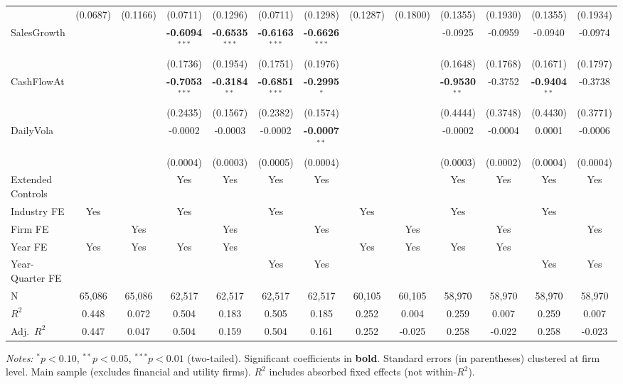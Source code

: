 \documentclass[11pt,a4paper]{article}
\begin{document}
\begin{table}[htbp]
\begin{tabular}{lcccccccccccc}
 & (0.0687) & (0.1166) & (0.0711) & (0.1296) & (0.0711) & (0.1298) & (0.1287) & (0.1800) & (0.1355) & (0.1930) & (0.1355) & (0.1934) \\
SalesGrowth &  &  & \textbf{-0.6094}$^{***}$ & \textbf{-0.6535}$^{***}$ & \textbf{-0.6163}$^{***}$ & \textbf{-0.6626}$^{***}$ &  &  & -0.0925 & -0.0959 & -0.0940 & -0.0974 \\
 &  &  & (0.1736) & (0.1954) & (0.1751) & (0.1976) &  &  & (0.1648) & (0.1768) & (0.1671) & (0.1797) \\
CashFlowAt &  &  & \textbf{-0.7053}$^{***}$ & \textbf{-0.3184}$^{**}$ & \textbf{-0.6851}$^{***}$ & \textbf{-0.2995}$^{*}$ &  &  & \textbf{-0.9530}$^{**}$ & -0.3752 & \textbf{-0.9404}$^{**}$ & -0.3738 \\
 &  &  & (0.2435) & (0.1567) & (0.2382) & (0.1574) &  &  & (0.4444) & (0.3748) & (0.4430) & (0.3771) \\
DailyVola &  &  & -0.0002 & -0.0003 & -0.0002 & \textbf{-0.0007}$^{**}$ &  &  & -0.0002 & -0.0004 & 0.0001 & -0.0006 \\
 &  &  & (0.0004) & (0.0003) & (0.0005) & (0.0004) &  &  & (0.0003) & (0.0002) & (0.0004) & (0.0004) \\
\midrule
Extended Controls &  &  & Yes & Yes & Yes & Yes &  &  & Yes & Yes & Yes & Yes \\
Industry FE & Yes &  & Yes &  & Yes &  & Yes &  & Yes &  & Yes &  \\
Firm FE &  & Yes &  & Yes &  & Yes &  & Yes &  & Yes &  & Yes \\
Year FE & Yes & Yes & Yes & Yes &  &  & Yes & Yes & Yes & Yes &  &  \\
Year-Quarter FE &  &  &  &  & Yes & Yes &  &  &  &  & Yes & Yes \\
\midrule
N & 65,086 & 65,086 & 62,517 & 62,517 & 62,517 & 62,517 & 60,105 & 60,105 & 58,970 & 58,970 & 58,970 & 58,970 \\
$R^2$ & 0.448 & 0.072 & 0.504 & 0.183 & 0.505 & 0.185 & 0.252 & 0.004 & 0.259 & 0.007 & 0.259 & 0.007 \\
Adj.~$R^2$ & 0.447 & 0.047 & 0.504 & 0.159 & 0.504 & 0.161 & 0.252 & -0.025 & 0.258 & -0.022 & 0.258 & -0.023 \\
\bottomrule
\end{tabular}
\begin{minipage}{\linewidth}
\vspace{2pt}\scriptsize
\textit{Notes:} $^{*}p<0.10$, $^{**}p<0.05$, $^{***}p<0.01$ (two-tailed).
 Significant coefficients in \textbf{bold}.
 Standard errors (in parentheses) clustered at firm level.
 Main sample (excludes financial and utility firms).
 $R^2$ includes absorbed fixed effects (not within-$R^2$).
\end{minipage}
\end{table}
\end{document}
